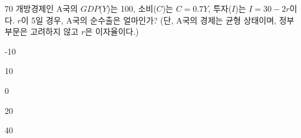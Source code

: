 \begin{question}{70}
개방경제인 A국의 $GDP$($Y$)는 100, 소비($C$)는 $C = 0.7Y$, 투자($I$)는 $I = 30 - 2r$이다. $r$이 5일 경우, A국의 순수출은 얼마인가? (단, A국의 경제는 균형 상태이며, 정부부문은 고려하지 않고 $r$은 이자율이다.)
\begin{choices}
  \item -10
  \item 10
  \item 0
  \item 20
  \item 40
\end{choices}
\end{question}
